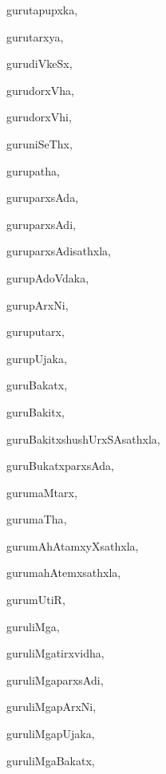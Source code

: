 \begin{multicols}{3}
{\noindent
{gurutapupxka}, \pageref{gurutapupxka}

\noindent
{gurutarxya}, \pageref{gurutarxya}

\noindent
{gurudiVkeSx}, \pageref{gurudiVkeSx}

\noindent
{gurudorxVha}, \pageref{gurudorxVha}

\noindent
{gurudorxVhi}, \pageref{gurudorxVhi}

\noindent
{guruniSeThx}, \pageref{guruniSeThx}

\noindent
{gurupatha}, \pageref{gurupatha}

\noindent
{guruparxsAda}, \pageref{guruparxsAda}

\noindent
{guruparxsAdi}, \pageref{guruparxsAdi}

\noindent
{guruparxsAdisathxla}, \pageref{guruparxsAdisathxla}

\noindent
{gurupAdoVdaka}, \pageref{gurupAdoVdaka}

\noindent
{gurupArxNi}, \pageref{gurupArxNi}

\noindent
{guruputarx}, \pageref{guruputarx}

\noindent
{gurupUjaka}, \pageref{gurupUjaka}

\noindent
{guruBakatx}, \pageref{guruBakatx}

\noindent
{guruBakitx}, \pageref{guruBakitx}

\noindent
{guruBakitxshushUrxSAsathxla}, \pageref{guruBakitxshushUrxSAsathxla}

\noindent
{guruBukatxparxsAda}, \pageref{guruBukatxparxsAda}

\noindent
{gurumaMtarx}, \pageref{gurumaMtarx}

\noindent
{gurumaTha}, \pageref{gurumaTha}

\noindent
{gurumAhAtamxyXsathxla}, \pageref{gurumAhAtamxyXsathxla}

\noindent
{gurumahAtemxsathxla}, \pageref{gurumahAtemxsathxla}

\noindent
{gurumUtiR}, \pageref{gurumUtiR}

\noindent
{guruliMga}, \pageref{guruliMga}

\noindent
{guruliMgatirxvidha}, \pageref{guruliMgatirxvidha}

\noindent
{guruliMgaparxsAdi}, \pageref{guruliMgaparxsAdi}

\noindent
{guruliMgapArxNi}, \pageref{guruliMgapArxNi}

\noindent
{guruliMgapUjaka}, \pageref{guruliMgapUjaka}

\noindent
{guruliMgaBakatx}, \pageref{guruliMgaBakatx}

}
\end{multicols}
